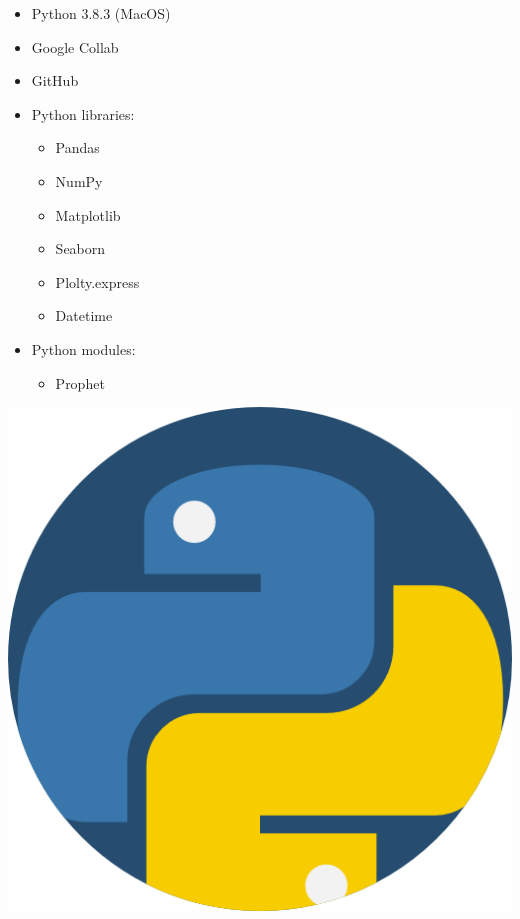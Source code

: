 
\begin{itemize}
   \item Python 3.8.3 (MacOS)
   \item Google Collab
   \item GitHub
   \item Python libraries:
   \begin{itemize}
     \item Pandas
     \item NumPy
     \item Matplotlib
     \item Seaborn
     \item Plolty.express
     \item Datetime
     \end{itemize}   
   \item Python modules:
   \begin{itemize}
     \item Prophet
    \end{itemize}
     \end{itemize}
\includegraphics[scale=0.3,angle=45]{images/python.png}